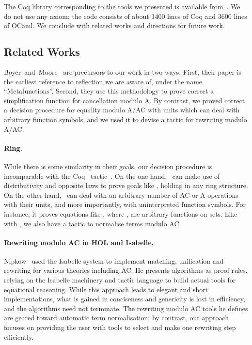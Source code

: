 \documentclass{llncs}
\begin{document}
The Coq library corresponding to the tools we presented is available
from~\cite{aac:web}. We do not use any axiom; the code consists of
about 1400 lines of Coq and 3600 lines of OCaml. We conclude with
related works and directions for future work.

\subsection{Related Works}
\label{ssec:related}

Boyer~and~Moore~\cite{BoyerMoore81} are precursors to our work in two
ways. First, their paper is the earliest reference to reflection we
are aware of, under the name ``Metafunctions''. Second, they use this
methodology to prove correct a simplification function for
cancellation modulo A.
By contrast, we proved correct a decision procedure for equality
modulo A/AC with units which can deal with arbitrary function symbols,
and we used it to devise a tactic for rewriting modulo A/AC.

\paragraph{Ring.}

While there is some similarity in their goals, our decision procedure
is incomparable with the Coq \ring\
tactic~\cite{gregoire-mahboubi-05}. On the one hand, \ring\ can make
use of distributivity and opposite laws to prove goals like
\coqinline, holding in any ring structure.
On the other hand, \tac\ can deal with an arbitrary number of AC or A
operations with their units, and more importantly, with uninterpreted
function symbols. For instance, it proves equations like
\coqinline, where
,  are arbitrary functions on sets.
Like with \coqinline, we also have a tactic to normalise terms modulo
AC.

\paragraph{Rewriting modulo AC in HOL and Isabelle.}

Nipkow~\cite{nipkow-er} used the Isabelle system to implement
matching, unification and rewriting for various theories including AC.
He presents algorithms as proof rules, relying on the Isabelle
machinery and tactic language to build actual tools for equational
reasoning. While this approach leads to elegant and short
implementations, what is gained in conciseness and genericity is lost
in efficiency, and the algorithms need not terminate. 
The rewriting modulo AC tools he defines are geared toward automatic
term normalisation; by contrast, our approach focuses on providing the
user with tools to select and make one rewriting step efficiently.
\end{document}

